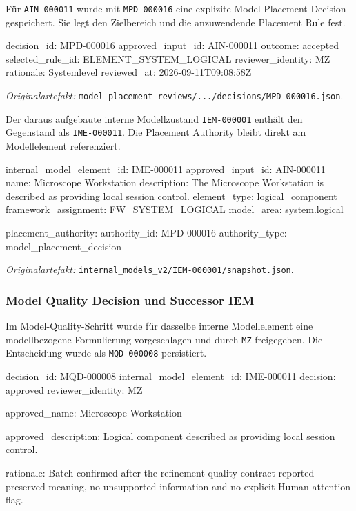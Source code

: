 Für \texttt{AIN-000011} wurde mit \texttt{MPD-000016} eine explizite Model
Placement Decision gespeichert. Sie legt den Zielbereich und die anzuwendende
Placement Rule fest.

\begin{evidencebox}
decision_id:       MPD-000016
approved_input_id: AIN-000011
outcome:           accepted
selected_rule_id:  ELEMENT_SYSTEM_LOGICAL
reviewer_identity: MZ
rationale:         Systemlevel
reviewed_at:       2026-09-11T09:08:58Z
\end{evidencebox}

\noindent\textit{Originalartefakt:}
\texttt{model\_placement\_reviews/.../decisions/MPD-000016.json}.

Der daraus aufgebaute interne Modellzustand \texttt{IEM-000001} enthält den
Gegenstand als \texttt{IME-000011}. Die Placement Authority bleibt direkt am
Modellelement referenziert.

\begin{evidencebox}
internal_model_element_id: IME-000011
approved_input_id:         AIN-000011
name:                      Microscope Workstation
description:               The Microscope Workstation is described as providing local session control.
element_type:              logical_component
framework_assignment:      FW_SYSTEM_LOGICAL
model_area:                system.logical

placement_authority:
  authority_id:            MPD-000016
  authority_type:          model_placement_decision
\end{evidencebox}

\noindent\textit{Originalartefakt:}
\texttt{internal\_models\_v2/IEM-000001/snapshot.json}.

\subsubsection{Model Quality Decision und Successor IEM}

Im Model-Quality-Schritt wurde für dasselbe interne Modellelement eine
modellbezogene Formulierung vorgeschlagen und durch \texttt{MZ} freigegeben.
Die Entscheidung wurde als \texttt{MQD-000008} persistiert.

\begin{evidencebox}
decision_id:              MQD-000008
internal_model_element_id: IME-000011
decision:                 approved
reviewer_identity:        MZ

approved_name:
  Microscope Workstation

approved_description:
  Logical component described as providing local session control.

rationale:
  Batch-confirmed after the refinement quality contract reported preserved
  meaning, no unsupported information and no explicit Human-attention flag.
\end{evidencebox}

